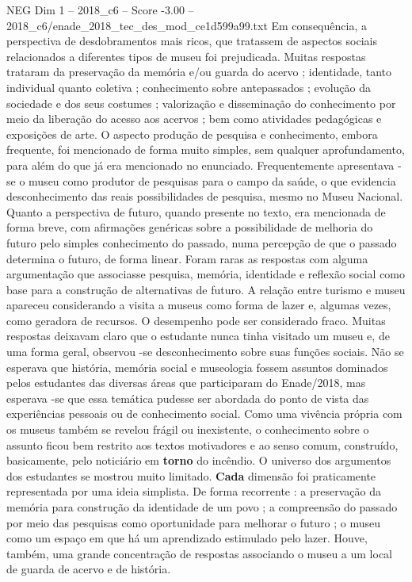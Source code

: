 \begin{textsample}{NEG Dim 1 – 2018\_c6 – Score -3.00 – 2018\_c6/enade\_2018\_tec\_des\_mod\_ce1d599a99.txt}
Em consequência, a perspectiva de desdobramentos mais ricos, que tratassem de aspectos sociais relacionados a diferentes tipos de museu foi prejudicada.
Muitas respostas trataram da preservação da memória e/ou guarda do acervo ; identidade, tanto individual quanto coletiva ; conhecimento sobre antepassados ; evolução da sociedade e dos seus costumes ; valorização e disseminação do conhecimento por meio da liberação do acesso aos acervos ; bem como atividades pedagógicas e exposições de arte.
O aspecto produção de pesquisa e conhecimento, embora frequente, foi mencionado de forma muito simples, sem qualquer aprofundamento, para além do que já era mencionado no enunciado.
Frequentemente apresentava -se o museu como produtor de pesquisas para o campo da saúde, o que evidencia desconhecimento das reais possibilidades de pesquisa, mesmo no Museu Nacional.
Quanto a perspectiva de futuro, quando presente no texto, era mencionada de forma breve, com afirmações genéricas sobre a possibilidade de melhoria do futuro pelo simples conhecimento do passado, numa percepção de que o passado determina o futuro, de forma linear.
Foram raras as respostas com alguma argumentação que associasse pesquisa, memória, identidade e reflexão social como base para a construção de alternativas de futuro.
A relação entre turismo e museu apareceu considerando a visita a museus como forma de lazer e, algumas vezes, como geradora de recursos.
O desempenho pode ser considerado fraco.
Muitas respostas deixavam claro que o estudante nunca tinha visitado um museu e, de uma forma geral, observou -se desconhecimento sobre suas funções sociais.
Não se esperava que história, memória social e museologia fossem assuntos dominados pelos estudantes das diversas áreas que participaram do Enade/2018, mas esperava -se que essa temática pudesse ser abordada do ponto de vista das experiências pessoais ou de conhecimento social.
Como uma vivência própria com os museus também se revelou frágil ou inexistente, o conhecimento sobre o assunto ficou bem restrito aos textos motivadores e ao senso comum, construído, basicamente, pelo noticiário em \textbf{torno} do incêndio.
O universo dos argumentos dos estudantes se mostrou muito limitado. \textbf{Cada} dimensão foi praticamente representada por uma ideia simplista.
De forma recorrente : a preservação da memória para construção da identidade de um povo ; a compreensão do passado por meio das pesquisas como oportunidade para melhorar o futuro ; o museu como um espaço em que há um aprendizado estimulado pelo lazer.
Houve, também, uma grande concentração de respostas associando o museu a um local de guarda de acervo e de história.

\end{textsample}
